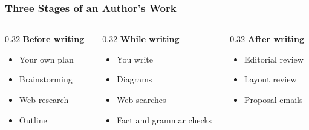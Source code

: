 \begin{frame}[fragile]\frametitle{Three Stages of an Author's Work}
\begin{columns}
    \begin{column}[T]{0.32\linewidth}
    \textbf{Before writing}
    \begin{itemize}
    \item Your own plan
    \item Brainstorming
    \item Web research
    \item Outline
    \end{itemize}
    \end{column}
    \begin{column}[T]{0.32\linewidth}
    \textbf{While writing}
    \begin{itemize}
    \item You write
    \item Diagrams
    \item Web searches
    \item Fact and grammar checks
    \end{itemize}
    \end{column}
    \begin{column}[T]{0.32\linewidth}
    \textbf{After writing}
    \begin{itemize}
    \item Editorial review
    \item Layout review
    \item Proposal emails
    \end{itemize}
    \end{column}
\end{columns}
\end{frame}
